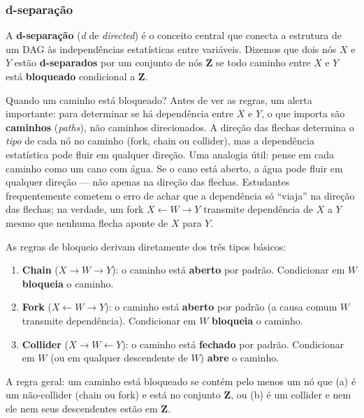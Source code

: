 \documentclass[
]{article}
\begin{document}
\subsubsection{d-separação}\label{d-separauxe7uxe3o}

A \textbf{d-separação} (\emph{d} de \emph{directed}) é o conceito central que conecta a estrutura de um DAG às independências estatísticas entre variáveis. Dizemos que dois nós \(X\) e \(Y\) estão \textbf{d-separados} por um conjunto de nós \(\mathbf{Z}\) se todo caminho entre \(X\) e \(Y\) está \textbf{bloqueado} condicional a \(\mathbf{Z}\).

Quando um caminho está bloqueado? Antes de ver as regras, um alerta importante: para determinar se há dependência entre \(X\) e \(Y\), o que importa são \textbf{caminhos} (\emph{paths}), não caminhos direcionados. A direção das flechas determina o \emph{tipo} de cada nó no caminho (fork, chain ou collider), mas a dependência estatística pode fluir em qualquer direção. Uma analogia útil: pense em cada caminho como um cano com água. Se o cano está aberto, a água pode fluir em qualquer direção --- não apenas na direção das flechas. Estudantes frequentemente cometem o erro de achar que a dependência só ``viaja'' na direção das flechas; na verdade, um fork \(X \leftarrow W \to Y\) transmite dependência de \(X\) a \(Y\) mesmo que nenhuma flecha aponte de \(X\) para \(Y\).

As regras de bloqueio derivam diretamente dos três tipos básicos:

\begin{enumerate}
\def\labelenumi{\arabic{enumi}.}
\item
  \textbf{Chain} (\(X \to W \to Y\)): o caminho está \textbf{aberto} por padrão. Condicionar em \(W\) \textbf{bloqueia} o caminho.
\item
  \textbf{Fork} (\(X \leftarrow W \to Y\)): o caminho está \textbf{aberto} por padrão (a causa comum \(W\) transmite dependência). Condicionar em \(W\) \textbf{bloqueia} o caminho.
\item
  \textbf{Collider} (\(X \to W \leftarrow Y\)): o caminho está \textbf{fechado} por padrão. Condicionar em \(W\) (ou em qualquer descendente de \(W\)) \textbf{abre} o caminho.
\end{enumerate}

A regra geral: um caminho está bloqueado se contém pelo menos um nó que (a) é um não-collider (chain ou fork) e está no conjunto \(\mathbf{Z}\), ou (b) é um collider e nem ele nem seus descendentes estão em \(\mathbf{Z}\).
\end{document}
